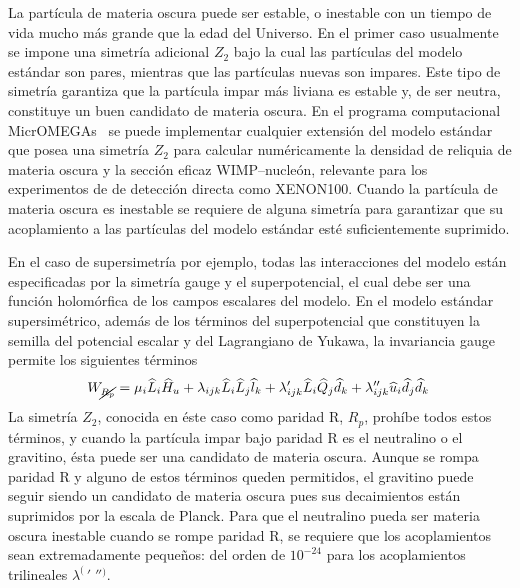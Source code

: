 La partícula de materia oscura puede ser estable, o inestable con un
tiempo de vida mucho más grande que la edad del Universo. En el primer
caso usualmente se impone una simetría adicional $Z_2$ bajo la cual
las partículas del modelo estándar son pares, mientras que las
partículas nuevas son impares. Este tipo de simetría garantiza que la
partícula impar más liviana es estable y, de ser neutra, constituye un
buen candidato de materia oscura. En el programa computacional
MicrOMEGAs~\cite{Belanger:2006is} se puede implementar cualquier
extensión del modelo estándar que posea una simetría $Z_2$ para
calcular numéricamente la densidad de reliquia de materia oscura y la
sección eficaz WIMP--nucleón, relevante para los experimentos de de
detección directa como XENON100. Cuando la partícula de materia oscura
es inestable se requiere de alguna simetría para garantizar que su
acoplamiento a las partículas del modelo estándar esté suficientemente
suprimido.

En el caso de supersimetría por ejemplo, todas las interacciones del
modelo están especificadas por la simetría gauge y el superpotencial,
el cual debe ser una función holomórfica de los campos escalares del
modelo. En el modelo estándar supersimétrico, además de los términos
del superpotencial que constituyen la semilla del potencial escalar y
del Lagrangiano de Yukawa, la invariancia gauge permite los siguientes
términos
\begin{equation}
  \label{eq:5}
  W_{\cancel{R_p}} = \mu_i\widehat{L}_i\widehat{H}_u + 
  \lambda_{i j k}\widehat{L}_i\widehat{L}_j\widehat{l}_k +
  \lambda'_{i j k}\widehat{L}_i\widehat{Q}_j\widehat{d}_k + 
  \lambda''_{ijk}\widehat{u}_i\widehat{d}_j\widehat{d}_k\,
\end{equation}
La simetría $Z_2$, conocida en éste caso como paridad R, $R_p$,
prohíbe todos estos términos, y cuando la partícula impar bajo paridad
R es el neutralino o el gravitino, ésta puede ser una candidato de
materia oscura. Aunque se rompa paridad R y alguno de estos términos
queden permitidos, el gravitino puede seguir siendo un candidato de
materia oscura pues sus decaimientos están suprimidos por la escala de
Planck. Para que el neutralino pueda ser materia oscura inestable
cuando se rompe paridad R, se requiere que los acoplamientos sean
extremadamente pequeños: del orden de $10^{-24}$ para los
acoplamientos trilineales ${\lambda^{(\ }}'\;''{}^)$. 

